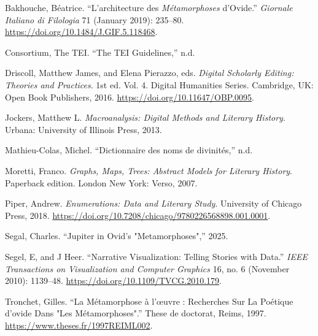 \documentclass[
  letterpaper,
  DIV=11,
  numbers=noendperiod]{scrreprt}
\newlength{\cslhangindent}
\newenvironment{CSLReferences}[2] %
 {\begin{list}{}{%
  \setlength{\itemindent}{0pt}
  \setlength{\leftmargin}{0pt}
  \setlength{\parsep}{0pt}
  \ifodd #1
   \setlength{\leftmargin}{\cslhangindent}
   \setlength{\itemindent}{-1\cslhangindent}
  \fi
  \setlength{\itemsep}{#2\baselineskip}}}
 {\end{list}}
\begin{document}
\label{refs}
\begin{CSLReferences}{1}{0}
Bakhouche, Béatrice. {``L'architecture des \emph{Métamorphoses}
d'Ovide.''} \emph{Giornale Italiano di Filologia} 71 (January 2019):
235--80. \url{https://doi.org/10.1484/J.GIF.5.118468}.

Consortium, The TEI. {``The {TEI} Guidelines,''} n.d.

Driscoll, Matthew James, and Elena Pierazzo, eds. \emph{Digital
Scholarly Editing: Theories and Practices}. 1st ed. Vol. 4. Digital
Humanities Series. Cambridge, {UK}: Open Book Publishers, 2016.
\url{https://doi.org/10.11647/OBP.0095}.

Jockers, Matthew L. \emph{Macroanalysis: Digital Methods and Literary
History}. Urbana: University of Illinois Press, 2013.

Mathieu-Colas, Michel. {``Dictionnaire des noms de divinités,''} n.d.

Moretti, Franco. \emph{Graphs, Maps, Trees: Abstract Models for Literary
History}. Paperback edition. London New York: Verso, 2007.

Piper, Andrew. \emph{Enumerations: Data and Literary Study}. University
of Chicago Press, 2018.
\url{https://doi.org/10.7208/chicago/9780226568898.001.0001}.

Segal, Charles. {``Jupiter in Ovid's "Metamorphoses",''} 2025.

Segel, E, and J Heer. {``Narrative Visualization: Telling Stories with
Data.''} \emph{{IEEE} Transactions on Visualization and Computer
Graphics} 16, no. 6 (November 2010): 1139--48.
\url{https://doi.org/10.1109/TVCG.2010.179}.

Tronchet, Gilles. {``La Métamorphose à l'œuvre : Recherches Sur La
Poétique d'ovide Dans "Les Métamorphoses".''} These de doctorat, Reims,
1997. \url{https://www.theses.fr/1997REIML002}.

\end{CSLReferences}

\end{document}
